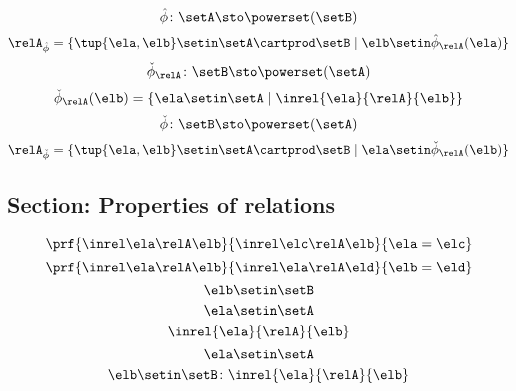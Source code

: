\begin{forslides}
\begin{equation}
\end{equation}
\begin{equation}\label{eq:slides_session2_rel_120}
\hat \phi \colon \setA \sto \powerset (\setB)
\end{equation}
 \begin{equation}\label{eq:slides_session2_rel_121}
\relA_{\hat \phi} = \{ \tup{\ela, \elb} \setin \setA \cartprod \setB \mid \elb \setin \hat \phi_{\relA}(\ela)  \}
\end{equation}
\begin{equation}\label{eq:slides_session2_rel_122}
\check \phi_{\relA} \colon \setB \sto \powerset (\setA)
\end{equation}
 \begin{equation}\label{eq:slides_session2_rel_123}
\check \phi_{\relA} (\elb) = \{ \ela \setin \setA \mid \inrel{\ela}{\relA}{\elb}\}
\end{equation}
\begin{equation}\label{eq:slides_session2_rel_124}
\check \phi \colon \setB \sto \powerset (\setA)
\end{equation}
 \begin{equation}\label{eq:slides_session2_rel_125}
 \relA_{\check \phi} = \{ \tup{\ela, \elb} \setin \setA \cartprod \setB \mid \ela \setin \check \phi_{\relA}(\elb)\}
\end{equation}

\subsection{Section: Properties of relations}


\begin{equation}\label{eq:slides_session2_rel_126}
\prf{
                      \inrel \ela \relA \elb
                  }{
                      \inrel \elc \relA \elb
                  }{
                      \ela=\elc
                  }
\end{equation}
 \begin{equation}\label{eq:slides_session2_rel_127}
 \prf{
                      \inrel \ela \relA \elb
                  }{
                      \inrel \ela \relA \eld
                  }{
                      \elb = \eld
                  }
\end{equation}
\begin{equation}\label{eq:slides_session2_rel_128}
\elb\setin \setB
\end{equation}
 \begin{equation}\label{eq:slides_session2_rel_129}
\ela\setin \setA
\end{equation}
\begin{equation}\label{eq:slides_session2_rel_130}
\inrel{\ela}{\relA}{\elb}
\end{equation}
 \begin{equation}\label{eq:slides_session2_rel_131}
\ela\setin \setA
\end{equation}
\begin{equation}\label{eq:slides_session2_rel_132}
\elb \setin \setB\colon \inrel{\ela}{\relA}{\elb}
\end{equation}


\end{forslides}
